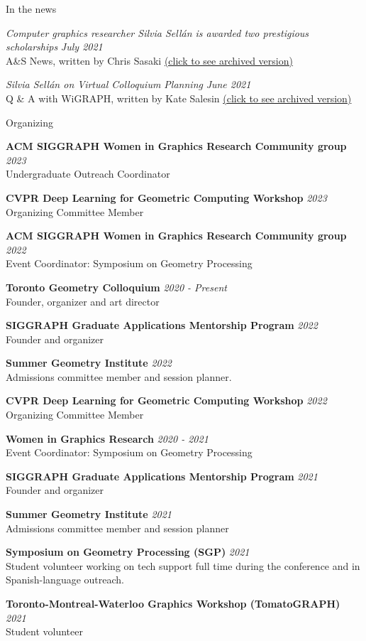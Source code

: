 \documentclass{resume}
\newcommand{\cvitem}[3]{
    {\bf #1} \hfill {\em \small #2} \\ 
    {\small#3 }
}
\begin{document}
\begin{rSection}{In the news}


{\it Computer graphics researcher Silvia Sellán is awarded two prestigious scholarships} \hfill {\small \it July 2021}\\ 
{\small A\&S News, written by Chris Sasaki \href{https://web.cs.toronto.edu/news-events/news/silvia-sellan-scholarships}{(click to see archived version)}} 

{\it Silvia Sellán on Virtual Colloquium Planning} \hfill {\small \it June 2021}\\ 
{\small Q \& A with WiGRAPH, written by Kate Salesin \href{https://www.wigraph.org/spotlights/silvia-sellan-on-virtual-colloquium-planning/}{(click to see archived version)}} 

\end{rSection}

\begin{rSection}{Organizing}

\cvitem{ACM SIGGRAPH Women in Graphics Research Community group}{2023}{Undergraduate Outreach Coordinator}

\cvitem{CVPR Deep Learning for Geometric Computing Workshop}{2023} 
{Organizing Committee Member}

\cvitem{ACM SIGGRAPH Women in Graphics Research Community group}{2022}{Event Coordinator: Symposium on Geometry Processing}
    
\cvitem{Toronto Geometry Colloquium}{2020 - Present}{Founder, organizer and art director}

\cvitem{SIGGRAPH Graduate Applications Mentorship Program}{2022} 
{Founder and organizer}

\cvitem{Summer Geometry Institute}{2022} 
{Admissions committee member and session planner.}

\cvitem{CVPR Deep Learning for Geometric Computing Workshop}{2022} 
{Organizing Committee Member}

\cvitem{Women in Graphics Research}{2020 - 2021}{Event Coordinator: Symposium on Geometry Processing}

\cvitem{SIGGRAPH Graduate Applications Mentorship Program}{2021} 
{Founder and organizer}

\cvitem{Summer Geometry Institute}{2021} 
{Admissions committee member and session planner}

\cvitem{Symposium on Geometry Processing (SGP)}{2021} 
{Student volunteer working on tech support full time during the conference and in Spanish-language outreach.}

\cvitem{Toronto-Montreal-Waterloo Graphics Workshop (TomatoGRAPH)}{2021} 
{Student volunteer}





\end{rSection}
\end{document}

